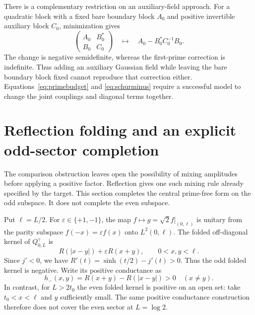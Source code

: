 \documentclass[11pt]{article}
\numberwithin{equation}{section}
\theoremstyle{definition}
\theoremstyle{remark}
\newcommand{\Qgam}{Q^{\gamma}}
\begin{document}
There is a complementary restriction on an auxiliary-field approach.
For a quadratic block with a fixed bare boundary block $A_0$ and positive
invertible auxiliary block $C_0$, minimization gives
\begin{equation}
\begin{pmatrix}A_0&B_0^*\\B_0&C_0\end{pmatrix}
\quad\longmapsto\quad A_0-B_0^*C_0^{-1}B_0.
\label{eq:schurminus}
\end{equation}
The change is negative semidefinite, whereas the first-prime correction
is indefinite. Thus adding an auxiliary Gaussian field while leaving
the bare boundary block fixed cannot reproduce that correction either.
Equations~\eqref{eq:primebudget} and \eqref{eq:schurminus} require a
successful model to change the joint couplings and diagonal terms together.

\section{Reflection folding and an explicit odd-sector completion}
\label{sec:oddcompletion}

The comparison obstruction leaves open the possibility of mixing amplitudes
before applying a positive factor. Reflection gives one such mixing rule
already specified by the target. This section completes the central
prime-free form on the odd subspace. It does not complete the even subspace.

Put $\ell=L/2$. For $\varepsilon\in\{+1,-1\}$, the map
$f\mapsto g=\sqrt2 f|_{(0,\ell)}$ is unitary from the parity subspace
$f(-x)=\varepsilon f(x)$ onto $L^2(0,\ell)$. The folded off-diagonal
kernel of $\Qgam_{0,L}$ is
\begin{equation}
R(|x-y|)+\varepsilon R(x+y),\qquad 0<x,y<\ell.
\label{eq:foldedkernel}
\end{equation}
Since $j'<0$, we have $R'(t)=\sinh(t/2)-j'(t)>0$. Thus the odd
folded kernel is negative. Write its positive conductance as
\begin{equation}
h_-(x,y)=R(x+y)-R(|x-y|)>0\quad(x\ne y).
\end{equation}
In contrast, for $L>2t_0$ the even folded kernel is positive on an open
set: take $t_0<x<\ell$ and $y$ sufficiently small. The same positive
conductance construction therefore does not cover the even sector at
$L=\log2$.
\end{document}
